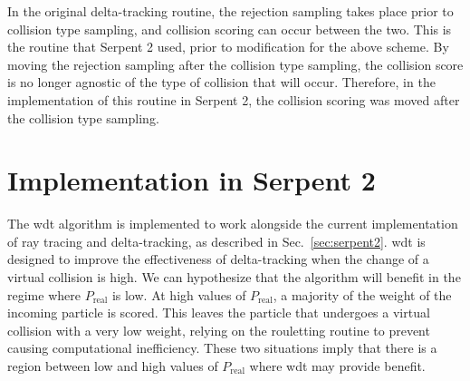 In the original delta-tracking routine, the rejection sampling takes
place prior to collision type sampling, and collision scoring can
occur between the two. This is the routine that Serpent 2 used, prior
to modification for the above scheme. By moving the rejection sampling
after the collision type sampling, the collision score is no longer
agnostic of the type of collision that will occur. Therefore, in the
implementation of this routine in Serpent 2, the collision scoring was
moved after the collision type sampling.

\section{Implementation in Serpent 2}
\label{sec:method_implementation}

The \gls{wdt} algorithm is implemented to work alongside the current
implementation of ray tracing and delta-tracking, as described in
Sec.~\ref{sec:serpent2}. \gls{wdt} is designed to improve the
effectiveness of delta-tracking when the change of a virtual collision
is high. We can hypothesize that the algorithm will benefit in the
regime where $P_{\mathrm{real}}$ is low. At high values of
$P_{\mathrm{real}}$, a majority of the weight of the incoming particle
is scored. This leaves the particle that undergoes a virtual collision
with a very low weight, relying on the rouletting routine to prevent
causing computational inefficiency. These two situations imply that
there is a region between low and high values of $P_\mathrm{real}$
where \gls{wdt} may provide benefit.

